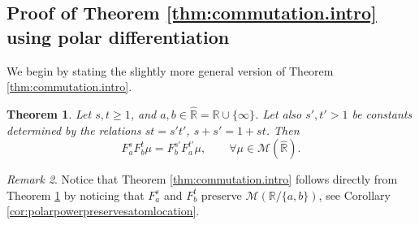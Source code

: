 \documentclass[reqno,11pt]{amsart}
\newtheorem{theorem}{Theorem}[section]
\theoremstyle{remark}
\newtheorem{remark}[theorem]{Remark}
\newcommand{\rr}{\mathbb{R}}
\newcommand{\MM}{\mathcal{M}}
\newcommand{\pfreepower}[2]{F_{#1}^{#2}}
\begin{document}
\subsection{Proof of Theorem \ref{thm:commutation.intro} using polar differentiation}

We begin by stating the slightly more general version of Theorem \ref{thm:commutation.intro}.

\begin{theorem}\label{thm:commutation}
Let $ s,t\geq 1$, and $a,b\in \hat{\rr} = \rr\cup \{\infty\}$. Let also $s',t' >1$ be constants determined by the relations $ st=s't' $, $ s+s' = 1+st $. Then
$$\pfreepower{a}{s}\pfreepower{b}{t} \mu =\pfreepower{b}{s'}\pfreepower{a}{t'}\mu, \qquad \forall \mu \in \MM(\hat{\rr}).$$
\end{theorem}

\begin{remark}
 Notice that Theorem \ref{thm:commutation.intro} follows directly from Theorem \ref{thm:commutation} by noticing that $ \pfreepower{a}{s} $ and $ \pfreepower{b}{t} $ preserve $ \MM({\rr}/\{a,b\}) $, see Corollary \ref{cor:polarpowerpreservesatomlocation}.
\end{remark}
\end{document}

